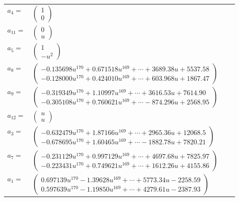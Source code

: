 \documentclass[1p]{elsarticle_modified}
\theoremstyle{definition}
\begin{document}
\begin{tabular}{m{7pt} m{180pt} m{7pt} m{180pt} }
\flushright $a_{4}=$&$\begin{pmatrix}1\\0\end{pmatrix}$ \\
\flushright $a_{11}=$&$\begin{pmatrix}0\\u\end{pmatrix}$ \\
\flushright $a_{5}=$&$\begin{pmatrix}1\\- u^2\end{pmatrix}$ \\
\flushright $a_{8}=$&$\begin{pmatrix}-0.135698 u^{170}+0.671518 u^{169}+\cdots+3689.38 u+5537.58\\-0.128000 u^{170}+0.424010 u^{169}+\cdots+603.968 u+1867.47\end{pmatrix}$ \\
\flushright $a_{9}=$&$\begin{pmatrix}-0.319349 u^{170}+1.10997 u^{169}+\cdots+3616.53 u+7614.90\\-0.305108 u^{170}+0.760621 u^{169}+\cdots-874.296 u+2568.95\end{pmatrix}$ \\
\flushright $a_{12}=$&$\begin{pmatrix}u\\u\end{pmatrix}$ \\
\flushright $a_{3}=$&$\begin{pmatrix}-0.632479 u^{170}+1.87166 u^{169}+\cdots+2965.36 u+12068.5\\-0.678695 u^{170}+1.60465 u^{169}+\cdots-1882.78 u+7820.21\end{pmatrix}$ \\
\flushright $a_{7}=$&$\begin{pmatrix}-0.231129 u^{170}+0.997129 u^{169}+\cdots+4697.68 u+7825.97\\-0.223431 u^{170}+0.749621 u^{169}+\cdots+1612.26 u+4155.86\end{pmatrix}$ \\
\flushright $a_{1}=$&$\begin{pmatrix}0.697139 u^{170}-1.39628 u^{169}+\cdots+5773.34 u-2258.59\\0.597639 u^{170}-1.19850 u^{169}+\cdots+4279.61 u-2387.93\end{pmatrix}$ \\

\end{tabular}
\end{document}

